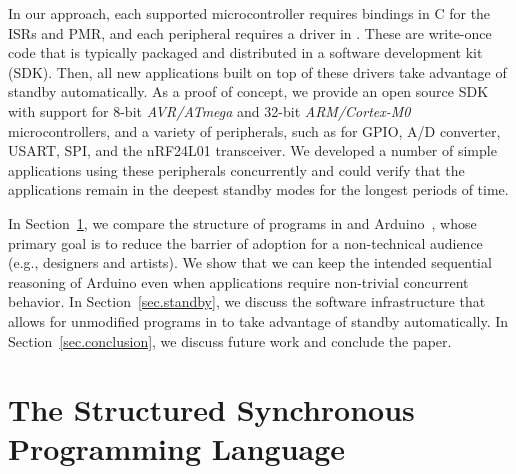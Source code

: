 In our approach, each supported microcontroller requires bindings in C for the
ISRs and PMR, and each peripheral requires a driver in \CEU.
These are write-once code that is typically packaged and distributed in a
software development kit (SDK).
%
Then, all new applications built on top of these drivers take advantage of
standby automatically.
%
As a proof of concept, we provide an open source SDK %
with support for 8-bit
\emph{AVR/ATmega} and 32-bit \emph{ARM/Cortex-M0} microcontrollers, and a
variety of peripherals, such as for GPIO, A/D converter, USART, SPI, and the
nRF24L01 transceiver.
%
We developed a number of simple applications using these peripherals
concurrently and could verify that the applications remain in the deepest
standby modes for the longest periods of time.

In Section~\ref{sec.ceu}, we compare the structure of programs in \CEU and
Arduino~\cite{arduino.book}, whose primary goal is to reduce the barrier of
adoption for a non-technical audience (e.g., designers and artists).
We show that we can keep the intended sequential reasoning of Arduino even when
applications require non-trivial concurrent behavior.
%
In Section~\ref{sec.standby}, we discuss the software infrastructure that
allows for unmodified programs in \CEU to take advantage of standby
automatically.
%
In Section~\ref{sec.conclusion}, we discuss future work and conclude the paper.



\section{The Structured Synchronous Programming Language \CEU}
\label{sec.ceu}

